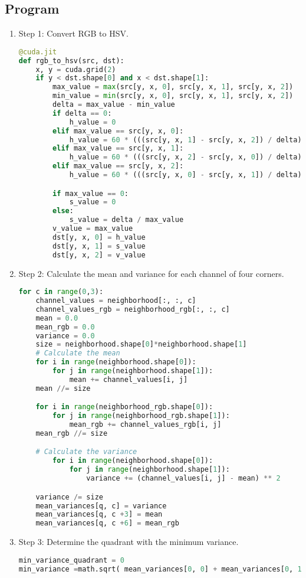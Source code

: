 \documentclass[12pt]{article}
\begin{document}
\subsection{Program}
\begin{enumerate}
    \item Step 1: Convert RGB to HSV.
    \begin{lstlisting}[language=Python]
@cuda.jit
def rgb_to_hsv(src, dst):
    x, y = cuda.grid(2)
    if y < dst.shape[0] and x < dst.shape[1]:
        max_value = max(src[y, x, 0], src[y, x, 1], src[y, x, 2])
        min_value = min(src[y, x, 0], src[y, x, 1], src[y, x, 2])
        delta = max_value - min_value
        if delta == 0:
            h_value = 0
        elif max_value == src[y, x, 0]:
            h_value = 60 * (((src[y, x, 1] - src[y, x, 2]) / delta) % 6)
        elif max_value == src[y, x, 1]:
            h_value = 60 * (((src[y, x, 2] - src[y, x, 0]) / delta) + 2)
        elif max_value == src[y, x, 2]:
            h_value = 60 * (((src[y, x, 0] - src[y, x, 1]) / delta) + 4)

        if max_value == 0:
            s_value = 0
        else:
            s_value = delta / max_value
        v_value = max_value
        dst[y, x, 0] = h_value
        dst[y, x, 1] = s_value
        dst[y, x, 2] = v_value  
    \end{lstlisting}
    \item Step 2: Calculate the mean and variance for each channel of four corners.
    \begin{lstlisting}[language=Python]
 for c in range(0,3):
    channel_values = neighborhood[:, :, c]
    channel_values_rgb = neighborhood_rgb[:, :, c]
    mean = 0.0
    mean_rgb = 0.0
    variance = 0.0
    size = neighborhood.shape[0]*neighborhood.shape[1]
    # Calculate the mean
    for i in range(neighborhood.shape[0]):
        for j in range(neighborhood.shape[1]):
            mean += channel_values[i, j]
    mean //= size

    for i in range(neighborhood_rgb.shape[0]):
        for j in range(neighborhood_rgb.shape[1]):
            mean_rgb += channel_values_rgb[i, j]
    mean_rgb //= size

    # Calculate the variance
        for i in range(neighborhood.shape[0]):
            for j in range(neighborhood.shape[1]):
                variance += (channel_values[i, j] - mean) ** 2

    variance /= size
    mean_variances[q, c] = variance
    mean_variances[q, c +3] = mean
    mean_variances[q, c +6] = mean_rgb
    \end{lstlisting}
    \item Step 3: Determine the quadrant with the minimum variance.
    \begin{lstlisting}[language=Python]
min_variance_quadrant = 0
min_variance =math.sqrt( mean_variances[0, 0] + mean_variances[0, 1] + mean_variances[0, 2])


\end{lstlisting}
\end{enumerate}
\end{document}
